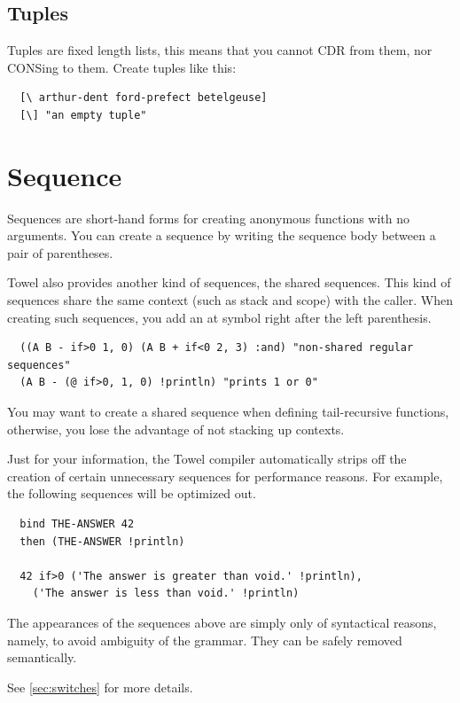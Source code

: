 \documentclass{report}
\begin{document}
\subsection{Tuples}

Tuples are fixed length lists, this means that you cannot CDR from them, nor CONSing to them. Create tuples like this:
\begin{mdframed}[style=example]
\begin{verbatim}
  [\ arthur-dent ford-prefect betelgeuse]
  [\] "an empty tuple"
\end{verbatim}
\end{mdframed}
\section{Sequence}

Sequences are short-hand forms for creating anonymous functions with no arguments. You can create a sequence by writing the sequence body between a pair of parentheses.

Towel also provides another kind of sequences, the shared sequences. This kind of sequences share the same context (such as stack and scope) with the caller. When creating such sequences, you add an at symbol right after the left parenthesis.

\begin{mdframed}[style=example]
\begin{verbatim}
  ((A B - if>0 1, 0) (A B + if<0 2, 3) :and) "non-shared regular sequences"
  (A B - (@ if>0, 1, 0) !println) "prints 1 or 0"
\end{verbatim}
\end{mdframed}

You may want to create a shared sequence when defining tail-recursive functions, otherwise, you lose the advantage of not stacking up contexts.

\begin{mdframed}[style=hint]
Just for your information, the Towel compiler automatically strips off the creation of certain unnecessary sequences for performance reasons. For example, the following sequences will be optimized out.

\begin{verbatim}
  bind THE-ANSWER 42
  then (THE-ANSWER !println)

  42 if>0 ('The answer is greater than void.' !println),
    ('The answer is less than void.' !println)
\end{verbatim}

The appearances of the sequences above are simply only of syntactical reasons, namely, to avoid ambiguity of the grammar. They can be safely removed semantically.

See \autoref{sec:switches} for more details.
\end{mdframed}
\end{document}
